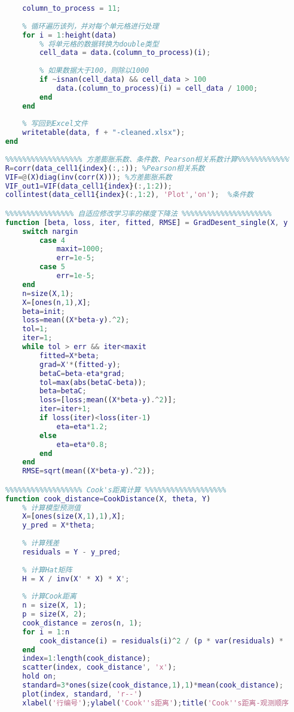 \documentclass[withoutpreface,bwprint]{cumcmthesis}  %
\begin{document}
\begin{appendices}
\begin{lstlisting}[language=matlab]
        % 指定要处理的列（假设是第十列）
        column_to_process = 11; 
        
        % 循环遍历该列，并对每个单元格进行处理
        for i = 1:height(data)
            % 将单元格的数据转换为double类型
            cell_data = data.(column_to_process)(i);
            
            % 如果数据大于100，则除以1000
            if ~isnan(cell_data) && cell_data > 100
                data.(column_to_process)(i) = cell_data / 1000;
            end
        end
        
        % 写回到Excel文件
        writetable(data, f + "-cleaned.xlsx");
    end
    
    %%%%%%%%%%%%%%%%%% 方差膨胀系数、条件数、Pearson相关系数计算%%%%%%%%%%%%%%%
    R=corr(data_cell1{index}(:,:)); %Pearson相关系数
    VIF=@(X)diag(inv(corr(X))); %方差膨胀系数
    VIF_out1=VIF(data_cell1{index}(:,1:2)); 
    collintest(data_cell1{index}(:,1:2), 'Plot','on');  %条件数

    %%%%%%%%%%%%%%%% 自适应修改学习率的梯度下降法 %%%%%%%%%%%%%%%%%%%%%
    function [beta, loss, iter, fitted, RMSE] = GradDesent_single(X, y, init, eta, maxit, err)
        switch nargin
            case 4
                maxit=1000;
                err=1e-5;
            case 5
                err=1e-5;
        end
        n=size(X,1);
        X=[ones(n,1),X];
        beta=init;
        loss=mean((X*beta-y).^2);
        tol=1;
        iter=1;
        while tol > err && iter<maxit
            fitted=X*beta;
            grad=X'*(fitted-y);
            betaC=beta-eta*grad;
            tol=max(abs(betaC-beta));
            beta=betaC;
            loss=[loss;mean((X*beta-y).^2)];
            iter=iter+1;
            if loss(iter)<loss(iter-1)
                eta=eta*1.2;
            else
                eta=eta*0.8;
            end
        end
        RMSE=sqrt(mean((X*beta-y).^2));

    %%%%%%%%%%%%%%%%%% Cook's距离计算 %%%%%%%%%%%%%%%%%%%
    function cook_distance=CookDistance(X, theta, Y)
        % 计算模型预测值
        X=[ones(size(X,1),1),X];
        y_pred = X*theta;
        
        % 计算残差
        residuals = Y - y_pred;
        
        % 计算Hat矩阵
        H = X / inv(X' * X) * X';
        
        % 计算Cook距离
        n = size(X, 1);
        p = size(X, 2);
        cook_distance = zeros(n, 1);
        for i = 1:n
            cook_distance(i) = residuals(i)^2 / (p * var(residuals) * (p + 1) * sum((residuals.^2) / ((p + 1) * var(residuals))));
        end
        index=1:length(cook_distance);
        scatter(index, cook_distance', 'x');
        hold on;
        standard=3*ones(size(cook_distance,1),1)*mean(cook_distance);
        plot(index, standard, 'r--')
        xlabel('行编号');ylabel('Cook''s距离');title('Cook''s距离-观测顺序图')


\end{lstlisting}
\end{appendices}
\end{document}
